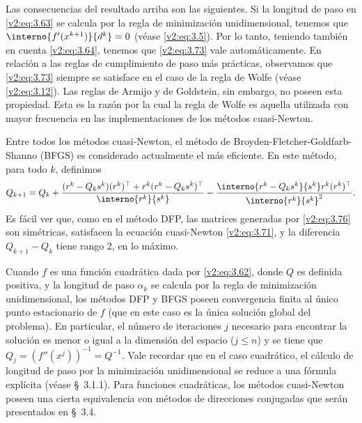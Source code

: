 Las consecuencias del resultado arriba son las siguientes. Si la longitud de paso en \eqref{v2:eq:3.63} se calcula por la regla de minimización unidimensional, tenemos que $\interno{f'(x^{k+1})}{d^k} = 0$ (véase \eqref{v2:eq:3.5}). Por lo tanto, teniendo también en cuenta \eqref{v2:eq:3.64}, tenemos que \eqref{v2:eq:3.73} vale automáticamente. En relación a las reglas de cumplimiento de paso más prácticas, observamos que \eqref{v2:eq:3.73} siempre se satisface en el caso de la regla de Wolfe (véase \eqref{v2:eq:3.12}). Las reglas de Armijo y de Goldstein, sin embargo, no poseen esta propiedad. Esta es la razón por la cual la regla de Wolfe es aquella utilizada con mayor frecuencia en las implementaciones de los métodos cuasi-Newton.

Entre todos los métodos cuasi-Newton, el método de Broyden-Fletcher-Goldfarb-Shanno (BFGS) es considerado actualmente el más eficiente. En este método, para todo $k$, definimos
\begin{equation}
    Q_{k+1} = Q_k + \frac{(r^k - Q_k s^k)(r^k)^\top + r^k(r^k - Q_k s^k)^\top}{\interno{r^k}{s^k}} - \frac{\interno{r^k - Q_k s^k}{s^k} r^k (r^k)^\top}{\interno{r^k}{s^k}^2}.
    \label{v2:eq:3.76}
\end{equation}
Es fácil ver que, como en el método DFP, las matrices generadas por \eqref{v2:eq:3.76} son simétricas, satisfacen la ecuación cuasi-Newton \eqref{v2:eq:3.71}, y la diferencia $Q_{k+1} - Q_k$ tiene rango 2, en lo máximo.

Cuando $f$ es una función cuadrática dada por \eqref{v2:eq:3.62}, donde $Q$ es definida positiva, y la longitud de paso $\alpha_k$ se calcula por la regla de minimización unidimensional, los métodos DFP y BFGS poseen convergencia finita al único punto estacionario de $f$ (que en este caso es la única solución global del problema). En particular, el número de iteraciones $j$ necesario para encontrar la solución es menor o igual a la dimensión del espacio ($j \le n$) y se tiene que $Q_j = (f''(x^j))^{-1} = Q^{-1}$. Vale recordar que en el caso cuadrático, el cálculo de longitud de paso por la minimización unidimensional se reduce a una fórmula explícita (véase \S~3.1.1). Para funciones cuadráticas, los métodos cuasi-Newton poseen una cierta equivalencia con métodos de direcciones conjugadas que serán presentados en \S~3.4.

